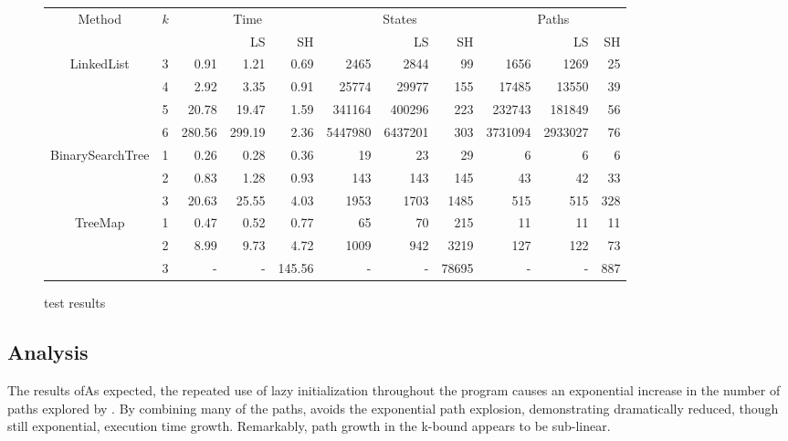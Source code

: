 \begin{figure*}[t]
  \centering
  \begin{tabular}{| c | c | r | r | r | r | r | r | r | r | r |}
  \hline
   \multirow{2}{*}{Method }&\multirow{2}{*}{ $k$ }
   &\multicolumn{3}{|c|}{Time} &\multicolumn{3}{|c|}{States} &\multicolumn{3}{|c|}{ Paths }\\
								&	&\gsetxt{} & LS		&SH		&\gsetxt{}	& LS & SH&\gsetxt{}	& LS & SH\\
   \hline
    \multirow{3}{*}{LinkedList }			&3	& 0.91	& 1.21	& 0.69	& 2465	& 2844	& 99		&1656	& 1269	& 25\\
   		 						& 4	& 2.92	& 3.35	& 0.91	& 25774	& 29977	& 155	&17485	& 13550	& 39\\
   								& 5	& 20.78	& 19.47	& 1.59	& 341164	& 400296	& 223	&232743	& 181849	& 56\\
								& 6	& 280.56	& 299.19	& 2.36	&5447980	&6437201	& 303	&3731094	&2933027	& 76\\
    \hline
    \multirow{3}{*}{BinarySearchTree }	& 1	& 0.26	& 0.28	& 0.36	& 19		& 23		& 29		& 6		& 6		& 6\\
   		 						& 2	& 0.83	& 1.28	& 0.93	& 143	& 143	& 145	& 43		& 42		& 33\\
   								& 3	& 20.63	& 25.55	& 4.03	& 1953	& 1703	& 1485	& 515	& 515	& 328\\
    \hline
      \multirow{3}{*}{TreeMap}			& 1	& 0.47	& 0.52	& 0.77	& 65		& 70		& 215	& 11		& 11		& 11\\
   		 						& 2	& 8.99	& 9.73	& 4.72	& 1009	& 942	& 3219	& 127	& 122	& 73\\
   								& 3	& -		& -		& 145.56	& -		& -		& 78695	& -		& -		& 887\\
						
    \hline
  \end{tabular}
  \caption{test results}
  \label{tab:results}
\end{figure*}

\subsection{Analysis}

The results ofAs expected, the repeated use of lazy initialization throughout the program causes an exponential increase in the number of paths explored by \gsetxt{}. By combining many of the \gsetxt{} paths, \symtxt{} avoids the exponential path explosion, demonstrating dramatically reduced, though still exponential, execution time growth. Remarkably, path growth in the k-bound appears to be sub-linear.

